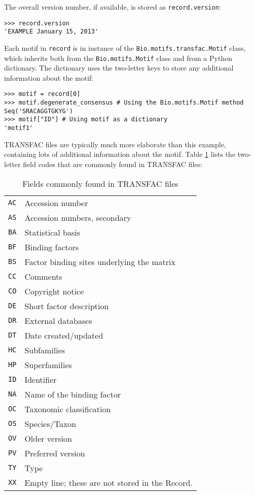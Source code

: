The overall version number, if available, is stored as \verb+record.version+:

\begin{verbatim}
>>> record.version
'EXAMPLE January 15, 2013'
\end{verbatim}

Each motif in \verb+record+ is in instance of the \verb+Bio.motifs.transfac.Motif+
class, which inherits both from the \verb+Bio.motifs.Motif+ class and
from a Python dictionary. The dictionary uses the two-letter keys to
store any additional information about the motif:

\begin{verbatim}
>>> motif = record[0]
>>> motif.degenerate_consensus # Using the Bio.motifs.Motif method
Seq('SRACAGGTGKYG')
>>> motif["ID"] # Using motif as a dictionary
'motif1'
\end{verbatim}

TRANSFAC files are typically much more elaborate than this example, containing
lots of additional information about the motif. Table \ref{table:transfaccodes}
lists the two-letter field codes that are commonly found in TRANSFAC files:
\begin{table}[h]
\label{table:transfaccodes}
\begin{center}
\caption{Fields commonly found in TRANSFAC files}
\begin{tabular}{|l|l||}
\verb+AC+ & Accession number \\
\verb+AS+ & Accession numbers, secondary \\
\verb+BA+ & Statistical basis \\
\verb+BF+ & Binding factors \\
\verb+BS+ & Factor binding sites underlying the matrix \\
\verb+CC+ & Comments \\
\verb+CO+ & Copyright notice \\
\verb+DE+ & Short factor description \\
\verb+DR+ & External databases \\
\verb+DT+ & Date created/updated \\
\verb+HC+ & Subfamilies \\
\verb+HP+ & Superfamilies \\
\verb+ID+ & Identifier \\
\verb+NA+ & Name of the binding factor \\
\verb+OC+ & Taxonomic classification \\
\verb+OS+ & Species/Taxon \\
\verb+OV+ & Older version \\
\verb+PV+ & Preferred version \\
\verb+TY+ & Type \\
\verb+XX+ & Empty line; these are not stored in the Record. \\
\end{tabular}
\end{center}
\end{table}

